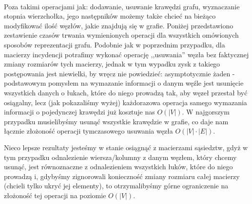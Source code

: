 ~

Poza takimi operacjami jak: dodawanie, usuwanie krawędzi grafu, wyznaczanie stopnia wierzchołka, jego następników możemy także chcieć na bieżąco modyfikować ilość węzłów, jakie znajdują się w grafie. Poniżej przedstawiono zestawienie czasów trwania wymienionych operacji dla wszystkich omówionych sposobów reprezentacji grafu. Podobnie jak w poprzednim przypadku, dla macierzy incydencji potrafimy wykonać operację ,,usuwania'' węzła bez faktycznej zmiany rozmiarów tych macierzy, jednak w tym wypadku zysk z takiego postępowania jest niewielki, by wręcz nie powiedzieć: asymptotycznie żaden - podstawowym pomysłem na wymazanie informacji o danym węźle jest usunięcie wszystkich danych o łukach, które do niego prowadzą tak, aby węzeł przestał być osiągalny, lecz (jak pokazaliśmy wyżej) każdorazowa operacja samego wymazania informacji o pojedynczej krawędzi już kosztuje nas $O \left( \left| V \right| \right) $. W najgorszym przypadku musielibyśmy usunąć wszystkie krawędzie w grafie, co daje nam łącznie złożoność operacji tymczasowego usuwania węzła $O \left( \left| V \right| \cdot  \left| E \right| \right) $. 

Nieco lepsze rezultaty jesteśmy w stanie osiągnąć z macierzami sąsiedztw, gdyż w tym przypadku odnalezienie wiersza/kolumny z danym węzłem, który chcemy usunąć, jest równoznaczne z odnalezieniem wszystkich łuków, które do niego prowadzą i, gdybyśmy zignorowali konieczność zmiany rozmiaru całej macierzy (chcieli tylko ukryć jej elementy), to otrzymalibyśmy górne ograniczenie na złożoność tej operacji na poziomie $ O \left( \left| V \right| \right)$.

